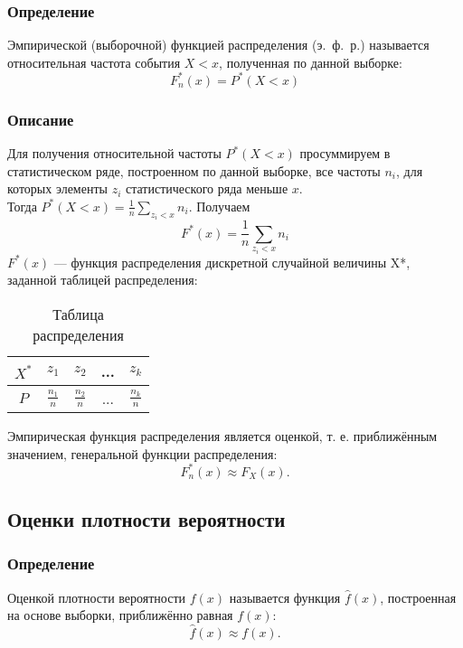\documentclass[12pt,a4paper]{article}
\begin{document}
		\subsubsection{Определение}
			Эмпирической (выборочной) функцией распределения (э.~ф.~р.) называется относительная частота события $X < x$, полученная по данной выборке:
			\begin{equation}\label{eqn:edf_prob}
			F^*_n(x) = P^*(X < x)
			\end{equation}
		
		\subsubsection{Описание}
			Для получения относительной частоты $P^*(X < x)$ просуммируем в статистическом ряде, построенном по данной выборке, все частоты $n_i$, для которых элементы $z_i$ статистического ряда меньше $x$.\\ Тогда $P^*(X<x) = \frac{1}{n}\sum_{z_i < x}n_i$. Получаем
			\begin{equation}\label{eqn:edf_sum}
			F^*(x) = \frac{1}{n}\sum_{z_i < x}n_i
			\end{equation}
			$F^*(x)$ ---  функция распределения дискретной случайной величины X*, заданной таблицей распределения:
			\begin{table}[h]
				\begin{center}
					\begin{tabular}{|c|c|c|c|c|}
						\hline
						$X^*$ & $z_1$ & $z_2$ & ... & $z_k$\\
						\hline
						$P$ & $\frac{n_1}{n}$ & $\frac{n_2}{n}$ & ... & $\frac{n_k}{n}$\\
						\hline
					\end{tabular}
				\end{center}
				\caption{Таблица распределения}
			\end{table}
			Эмпирическая функция распределения является оценкой, т. е. приближённым значением, генеральной функции распределения:
			\begin{equation}\label{eqn:edf_approx}
			F^*_n(x) \approx F_X(x).
			\end{equation}
		
	\subsection{Оценки плотности вероятности}
		\subsubsection{Определение}
			Оценкой плотности вероятности $f(x)$ называется функция $\hat{f}(x)$, построенная на основе выборки, приближённо равная $f(x)$:
			\begin{equation}\label{eqn:pdf_approx}
			\hat{f}(x) \approx f(x).
			\end{equation}
		
\end{document}
